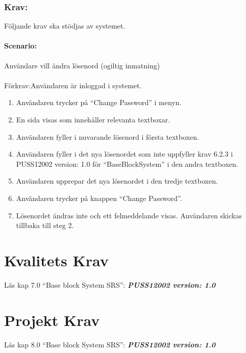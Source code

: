 \documentclass[paper=a4, fontsize=11pt,twoside]{article}
\begin{document}
  \subsubsection{Krav:}Följande krav ska stödjas av systemet.
  \paragraph{Scenario:}Användare vill ändra lösenord (ogiltig inmatning)
  \paragraph{}
  Förkrav:Användaren är inloggad i systemet.
  \begin{enumerate}
 \item  Användaren trycker på “Change Password” i menyn.
 \item	 En sida visas som innehåller relevanta textboxar.
 \item	Användaren fyller i nuvarande lösenord i första textboxen.
 \item	Användaren fyller i det nya lösenordet som inte uppfyller krav 6.2.3 i PUSS12002 version: 1.0 för “BaseBlockSystem” i den andra textboxen.
 \item	Användaren upprepar det nya lösenordet i den tredje textboxen.
 \item	Användaren trycker på knappen “Change Password”.
 \item	Lösenordet ändras inte och ett felmeddelande visas. Användaren skickas tillbaka till steg 2.
  	
  \end{enumerate}
 
\section{Kvalitets Krav}
Läs kap 7.0  “Base block System SRS”:   \textbf{\textit{PUSS12002 version: 1.0}} 
\section{Projekt Krav}
Läs kap 8.0  “Base block System SRS”:   \textbf{\textit{PUSS12002 version: 1.0}} 
\end{document}
